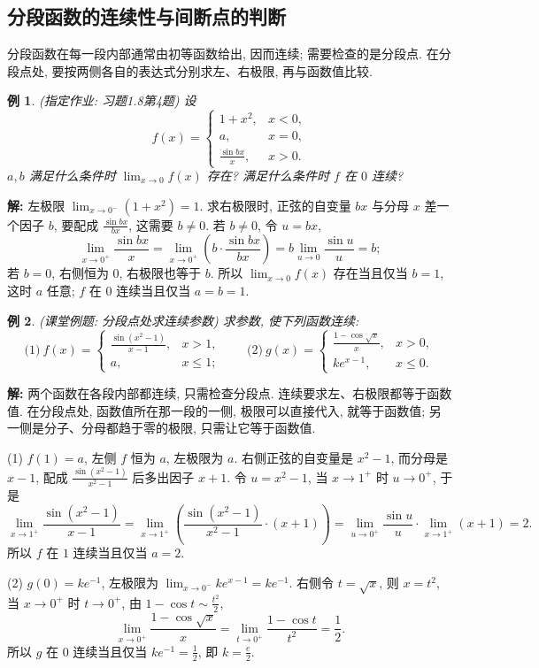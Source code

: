 \documentclass[UTF8,openany]{ctexbook}
\theoremstyle{chinesetextbook}
\newtheorem{example}{例}[section]
\newenvironment{cnsolution}{\par\indent\textbf{解:} \ignorespaces}{\par}
\begin{document}
\subsection{分段函数的连续性与间断点的判断}
分段函数在每一段内部通常由初等函数给出, 因而连续; 需要检查的是分段点. 在分段点处, 要按两侧各自的表达式分别求左、右极限, 再与函数值比较.
\begin{example}
\textnormal{(指定作业: 习题1.8第4题)} 设
\[
f(x)=\begin{cases}1+x^2,&x<0,\\a,&x=0,\\\frac{\sin bx}x,&x>0.\end{cases}
\]
$a,b$ 满足什么条件时 $\displaystyle\lim_{x\to0}f(x)$ 存在? 满足什么条件时 $f$ 在 $0$ 连续?
\end{example}
\begin{cnsolution}
左极限 $\displaystyle\lim_{x\to0^-}(1+x^2)=1$. 求右极限时, 正弦的自变量 $bx$ 与分母 $x$ 差一个因子 $b$, 要配成 $\displaystyle\frac{\sin bx}{bx}$, 这需要 $b\ne0$. 若 $b\ne0$, 令 $u=bx$,
\[
\lim_{x\to0^+}\frac{\sin bx}x=\lim_{x\to0^+}\left(b\cdot\frac{\sin bx}{bx}\right)=b\lim_{u\to0}\frac{\sin u}u=b;
\]
若 $b=0$, 右侧恒为 $0$, 右极限也等于 $b$. 所以 $\displaystyle\lim_{x\to0}f(x)$ 存在当且仅当 $b=1$, 这时 $a$ 任意; $f$ 在 $0$ 连续当且仅当 $a=b=1$.
\end{cnsolution}
\begin{example}
\textnormal{(课堂例题: 分段点处求连续参数)} 求参数, 使下列函数连续:
\[
\text{(1)}\ f(x)=\begin{cases}\frac{\sin(x^2-1)}{x-1},&x>1,\\a,&x\le1;\end{cases}\qquad\text{(2)}\ g(x)=\begin{cases}\frac{1-\cos\sqrt x}x,&x>0,\\ke^{x-1},&x\le0.\end{cases}
\]
\end{example}
\begin{cnsolution}
两个函数在各段内部都连续, 只需检查分段点. 连续要求左、右极限都等于函数值. 在分段点处, 函数值所在那一段的一侧, 极限可以直接代入, 就等于函数值; 另一侧是分子、分母都趋于零的极限, 只需让它等于函数值.

(1) $f(1)=a$, 左侧 $f$ 恒为 $a$, 左极限为 $a$. 右侧正弦的自变量是 $x^2-1$, 而分母是 $x-1$, 配成 $\displaystyle\frac{\sin(x^2-1)}{x^2-1}$ 后多出因子 $x+1$. 令 $u=x^2-1$, 当 $x\to1^+$ 时 $u\to0^+$, 于是
\[
\lim_{x\to1^+}\frac{\sin(x^2-1)}{x-1}=\lim_{x\to1^+}\left(\frac{\sin(x^2-1)}{x^2-1}\cdot(x+1)\right)=\lim_{u\to0^+}\frac{\sin u}u\cdot\lim_{x\to1^+}(x+1)=2.
\]
所以 $f$ 在 $1$ 连续当且仅当 $a=2$.

(2) $g(0)=ke^{-1}$, 左极限为 $\displaystyle\lim_{x\to0^-}ke^{x-1}=ke^{-1}$. 右侧令 $t=\sqrt x$, 则 $x=t^2$, 当 $x\to0^+$ 时 $t\to0^+$, 由 $\displaystyle1-\cos t\sim\frac{t^2}2$,
\[
\lim_{x\to0^+}\frac{1-\cos\sqrt x}x=\lim_{t\to0^+}\frac{1-\cos t}{t^2}=\frac12.
\]
所以 $g$ 在 $0$ 连续当且仅当 $\displaystyle ke^{-1}=\frac12$, 即 $\displaystyle k=\frac e2$.
\end{cnsolution}
\end{document}
